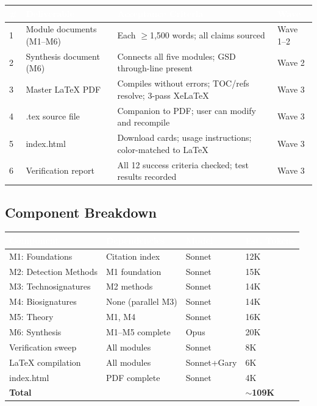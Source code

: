 \documentclass[11pt,letterpaper]{article}
\newcommand{\tableheader}[1]{\textbf{\sffamily\textcolor{white}{#1}}}
\begin{document}
\begin{center}
\begin{tabularx}{\textwidth}{C{0.5cm}L{4cm}XC{2cm}}
\toprule
{}
\tableheader{\#} & \tableheader{Deliverable} & \tableheader{Acceptance Criteria} & \tableheader{Wave} \\
 & Module documents (M1--M6) & Each $\geq$1,500 words; all claims sourced & Wave 1--2 \\
2 & Synthesis document (M6) & Connects all five modules; GSD through-line present & Wave 2 \\
3 & Master LaTeX PDF & Compiles without errors; TOC/refs resolve; 3-pass XeLaTeX & Wave 3 \\
4 & .tex source file & Companion to PDF; user can modify and recompile & Wave 3 \\
5 & index.html & Download cards; usage instructions; color-matched to LaTeX & Wave 3 \\
6 & Verification report & All 12 success criteria checked; test results recorded & Wave 3 \\
\bottomrule
\end{tabularx}
\end{center}

\subsection{Component Breakdown}

\begin{center}
\begin{tabularx}{\textwidth}{L{3.5cm}L{3cm}C{2cm}C{2cm}}
\toprule
{}
\tableheader{Component} & \tableheader{Dependencies} & \tableheader{Model} & \tableheader{Est. Tokens} \\
\midrule
M1: Foundations & Citation index & Sonnet & 12K \\
M2: Detection Methods & M1 foundation & Sonnet & 15K \\
M3: Technosignatures & M2 methods & Sonnet & 14K \\
M4: Biosignatures & None (parallel M3) & Sonnet & 14K \\
M5: Theory & M1, M4 & Sonnet & 16K \\
M6: Synthesis & M1--M5 complete & Opus & 20K \\
Verification sweep & All modules & Sonnet & 8K \\
LaTeX compilation & All modules & Sonnet+Gary & 6K \\
index.html & PDF complete & Sonnet & 4K \\
\midrule
\textbf{Total} & & & \textbf{$\sim$109K} \\
\bottomrule
\end{tabularx}
\end{center}
\end{document}
